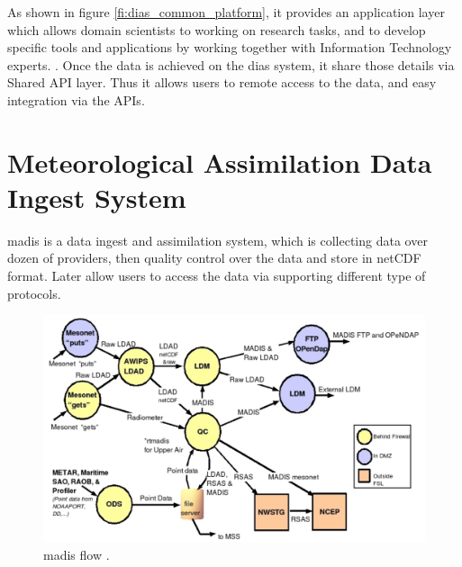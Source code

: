 As shown in figure \ref{fi:dias_common_platform}, it provides an application layer which allows domain scientists to working on research tasks, and to develop specific tools and applications by working together with Information Technology experts. \cite{Kawasaki2018DataReduction}. Once the data is achieved on the \acrshort{dias} system, it share those details via Shared API layer. Thus it allows users to remote access to the data, and easy integration via the APIs.



\section{Meteorological Assimilation Data Ingest System}
\label{se:madis}
\acrfull{madis} is a data ingest and assimilation system, which is collecting data over dozen of providers, then quality control over the data and store in \acrshort{netCDF} format. Later allow users to access the data via supporting different type of protocols.

\begin{figure}[htp]
    \centering
    \includegraphics[width=1\textwidth]{lit/other/madis_flow.png}
    \caption[\acrshort{madis} flow]{\acrshort{madis} flow \cite{Macdermaid2005ARCHITECTUREP2.39}.}
    \label{fi:madis_flow}
\end{figure}

